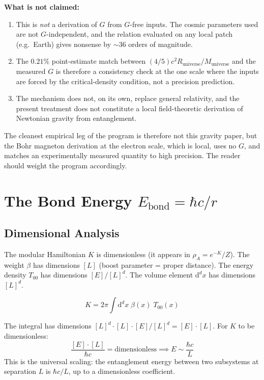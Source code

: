 \documentclass[11pt,letterpaper]{article}
\newcommand{\Runiv}{R_{\mathrm{universe}}}
\newcommand{\Muniv}{M_{\mathrm{universe}}}
\begin{document}
\textbf{What is not claimed:}
\begin{enumerate}
  \item This is \emph{not} a derivation of $G$ from $G$-free inputs.
    The cosmic parameters used are not $G$-independent, and the
    relation evaluated on any local patch (e.g.~Earth) gives
    nonsense by $\sim 36$ orders of magnitude.
  \item The $0.21\%$ point-estimate match between
    $(4/5) c^2\Runiv/\Muniv$ and the measured $G$ is therefore a
    consistency check at the one scale where the inputs are forced
    by the critical-density condition, not a precision prediction.
  \item The mechanism does not, on its own, replace general
    relativity, and the present treatment does not constitute a
    local field-theoretic derivation of Newtonian gravity from
    entanglement.
\end{enumerate}

The cleanest empirical leg of the program is therefore not this
gravity paper, but the Bohr magneton derivation at the electron
scale, which is local, uses no $G$, and matches an experimentally
measured quantity to high precision. The reader should weight the
program accordingly.

\section{The Bond Energy $E_{\mathrm{bond}} = \hbar c / r$}

\subsection{Dimensional Analysis}

The modular Hamiltonian $K$ is dimensionless (it appears in $\rho_A = e^{-K}/Z$).
The weight $\beta$ has dimensions $[L]$ (boost parameter = proper distance).
The energy density $T_{00}$ has dimensions $[E]/[L]^d$. The volume element
$\mathrm{d}^d x$ has dimensions $[L]^d$.

\begin{equation}
  K = 2\pi \int \mathrm{d}^d x \; \beta(x) \; T_{00}(x)
  \label{eq:dim_analysis}
\end{equation}

The integral has dimensions $[L]^d \cdot [L] \cdot [E]/[L]^d = [E] \cdot [L]$.
For $K$ to be dimensionless:
\begin{equation}
  \frac{[E] \cdot [L]}{\hbar c} = \mathrm{dimensionless}
  \implies E \sim \frac{\hbar c}{L}
  \label{eq:scaling}
\end{equation}
This is the universal scaling: the entanglement energy between two subsystems
at separation $L$ is $\hbar c/L$, up to a dimensionless coefficient.
\end{document}
